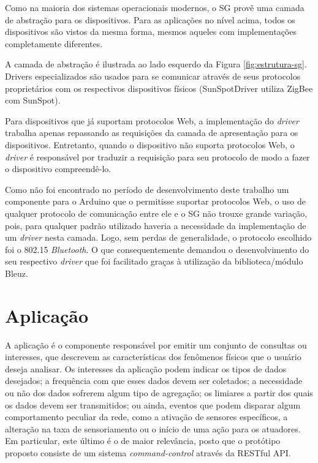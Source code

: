 \documentclass[12pt,a4paper,oneside]{report}
\begin{document}
Como na maioria dos sistemas operacionais modernos, o SG provê uma camada de abstração para os dispositivos. Para as aplicações no nível acima, todos os dispositivos são vistos da mesma forma, mesmos aqueles com implementações completamente diferentes.

A camada de abstração é ilustrada ao lado esquerdo da Figura \ref{fig:estrutura-sg}. Drivers especializados são usados para se comunicar através de seus protocolos proprietários com os respectivos dispositivos físicos (SunSpotDriver utiliza ZigBee com SunSpot).

Para dispositivos que já suportam protocolos Web, a implementação do \emph{driver} trabalha apenas repassando as requisições da camada de apresentação para os dispositivos. Entretanto, quando o dispositivo não suporta protocolos Web, o \emph{driver} é responsável por traduzir a requisição para seu protocolo de modo a fazer o dispositivo compreendê-lo.

Como não foi encontrado no período de desenvolvimento deste trabalho um componente para o Arduino que o permitisse suportar protocolos Web, o uso de qualquer protocolo de comunicação entre ele e o SG não trouxe grande variação, pois, para qualquer padrão utilizado haveria a necessidade da implementação de um \emph{driver} nesta camada. Logo, sem perdas de generalidade, o protocolo escolhido foi o 802.15 \emph{Bluetooth}. O que consequentemente demandou o desenvolvimento do seu respectivo \emph{driver} que foi facilitado graças à utilização da biblioteca/módulo Bleuz.

\section{Aplicação}
\label{sec:aplicacao}

A aplicação é o componente responsável por emitir um conjunto de consultas ou interesses, que descrevem as características dos fenômenos físicos que o usuário deseja analisar. Os interesses da aplicação podem indicar os tipos de dados desejados; a frequência com que esses dados devem ser coletados; a necessidade ou não dos dados sofrerem algum tipo de agregação; os limiares a partir dos quais os dados devem ser transmitidos; ou ainda, eventos que podem disparar algum comportamento peculiar da rede, como a ativação de sensores específicos, a alteração na taxa de sensoriamento ou o início de uma ação para os atuadores. Em particular, este último é o de maior relevância, posto que o protótipo proposto consiste de um sistema  \emph{command-control} através da RESTful API.
\end{document}
